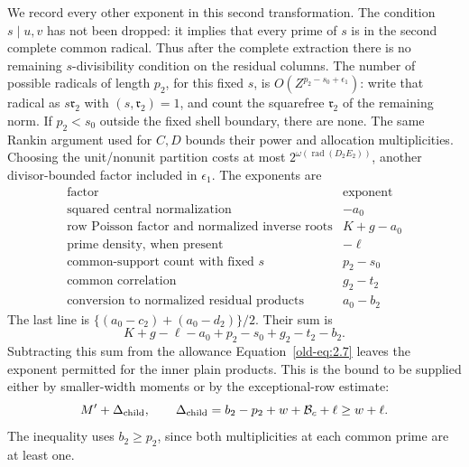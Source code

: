 \documentclass[12pt]{article}
\begin{document}
We record every other exponent in this second transformation.  The
condition \(s\mid u,v\) has not been dropped: it implies that every
prime of \(s\) is in the second complete common radical.  Thus after the complete extraction there is no remaining
\(s\)-divisibility condition on the residual columns.  The number of
possible radicals of length \(p_2\), for this fixed
\(s\), is \(O(Z^{p_2-s_0+\epsilon_1})\): write that radical as
\(s\mathfrak r_2\) with \((s,\mathfrak r_2)=1\), and count the
squarefree \(\mathfrak r_2\) of the remaining norm.  If \(p_2<s_0\)
outside the fixed shell boundary, there are none.  The same Rankin
argument used for \(C,D\) bounds their power and allocation
multiplicities.  Choosing the unit/nonunit partition costs at most
\(2^{\omega(\operatorname{rad}(D_2E_2))}\), another divisor-bounded
factor included in \(\epsilon_1\).  The exponents are
\[
 \begin{array}{l|r}
 \text{factor}&\text{exponent}\\ \hline
 \text{squared central normalization}&-a_0\\
 \text{row Poisson factor and normalized inverse roots}&K+g-a_0\\
 \text{prime density, when present}&-\ell\\
 \text{common-support count with fixed }s&p_2-s_0\\
 \text{common correlation}&g_2-t_2\\
 \text{conversion to normalized residual products}&a_0-b_2
 \end{array}
\]
The last line is
\(\{(a_0-c_2)+(a_0-d_2)\}/2\).
Their sum is
\[
 K+g-\ell-a_0+p_2-s_0+g_2-t_2-b_2.
\]
Subtracting this sum from the allowance
Equation~\eqref{old-eq:2.7} leaves the exponent permitted for
the inner plain products.  This is the bound to be supplied either by
smaller-width moments or by the exceptional-row estimate:
\begin{equation}
 M'+\Delta_{\rm child},\qquad
 \Delta_{\rm child}=b_2-p_2+w+\mathcal B_c+\ell
                   \ge w+\ell.
 \label{old-eq:2.14}
\end{equation}
The inequality uses \(b_2\ge p_2\), since both multiplicities
at each common prime are at least one.
\end{document}
